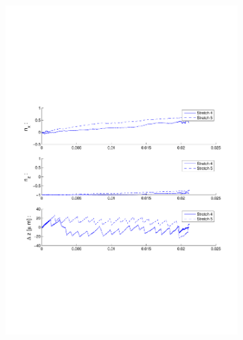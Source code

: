 \begin{figure}[ H]

\centering

\includegraphics[width=0.8\textwidth]{Images/Particle 2/Stretch4.pdf}

\end{figure}


